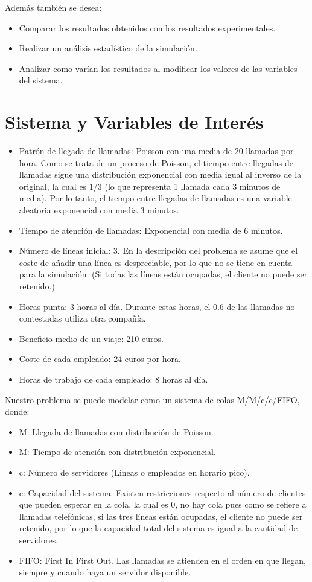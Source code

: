 \documentclass{article}
\begin{document}
Además también se desea:
\begin{itemize}
    \item Comparar los resultados obtenidos con los resultados experimentales.
    \item Realizar un análisis estadístico de la simulación.
    \item Analizar como varían los resultados al modificar los valores de las variables del sistema.
\end{itemize}

\section{Sistema y Variables de Interés}
\begin{itemize}
    \item Patrón de llegada de llamadas: Poisson con una media de 20 llamadas por hora. Como se trata de un proceso de Poisson, el tiempo entre llegadas de llamadas sigue una distribución exponencial con media igual al inverso de la original, la cual es 1/3 (lo que representa 1 llamada cada 3 minutos de media). Por lo tanto, el tiempo entre llegadas de llamadas es una variable aleatoria exponencial con media 3 minutos.
    \item Tiempo de atención de llamadas: Exponencial con media de 6 minutos.
    \item Número de líneas inicial: 3. En la descripción del problema se asume que el coste de añadir una línea es despreciable, por lo que no se tiene en cuenta para la simulación. (Si todas las líneas están ocupadas, el cliente no puede ser retenido.)
    \item Horas punta: 3 horas al día. Durante estas horas, el 0.6 de las llamadas no contestadas utiliza otra compañía.
    \item Beneficio medio de un viaje: 210 euros.
    \item Coste de cada empleado: 24 euros por hora.
    \item Horas de trabajo de cada empleado: 8 horas al día.
\end{itemize}

Nuestro problema se puede modelar como un sistema de colas M/M/c/c/FIFO, donde:

\begin{itemize}
    \item M: Llegada de llamadas con distribución de Poisson.
    \item M: Tiempo de atención con distribución exponencial.
    \item c: Número de servidores (Lineas o empleados en horario pico).
    \item c: Capacidad del sistema. Existen restricciones respecto al número de clientes que pueden esperar en la cola, la cual es 0, no hay cola pues como se refiere a llamadas telefónicas, si las tres líneas están ocupadas, el cliente no puede ser retenido, por lo que la capacidad total del sistema es igual a la cantidad de servidores.
    \item FIFO: First In First Out. Las llamadas se atienden en el orden en que llegan, siempre y cuando haya un servidor disponible.
\end{itemize}
\end{document}
